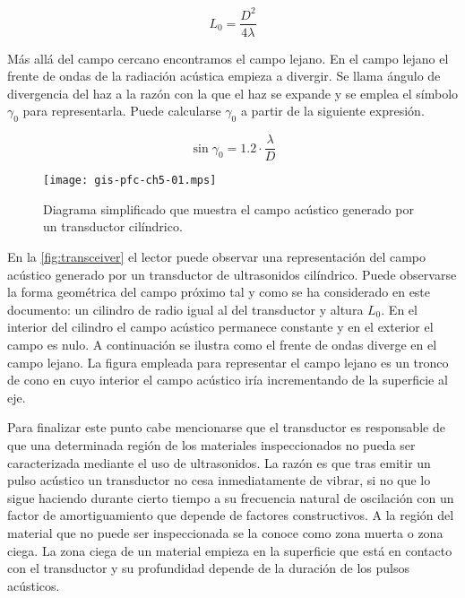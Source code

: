 \begin{equation}
	L_0 = \frac{D^2}{4\lambda}
	\label{eq:nearfield}
\end{equation}

Más allá del campo cercano encontramos el campo lejano. En el campo lejano
el frente de ondas de la radiación acústica empieza a divergir. Se llama
ángulo de divergencia del haz a la razón con la que el haz se expande y se
emplea el símbolo $\gamma_0$ para representarla. Puede calcularse
$\gamma_0$ a partir de la siguiente expresión.

\begin{equation}
	\sin{\gamma_0} = 1.2\cdot\frac{\lambda}{D}
	\label{eq:Adivergence}
\end{equation}

\begin{figure}
	\begin{center}
		\texttt{[image: gis-pfc-ch5-01.mps]}
	\end{center}
	\caption[Campo acústico generado por un transductor
	cilíndrico]{Diagrama simplificado que muestra el campo acústico
	generado por un transductor cilíndrico.}
	\label{fig:transceiver}
\end{figure}

En la \vref{fig:transceiver} el lector puede observar una representación
del campo acústico generado por un transductor de ultrasonidos cilíndrico.
Puede observarse la forma geométrica del campo próximo tal y como se ha
considerado en este documento: un cilindro de radio igual al del
transductor y altura $L_0$. En el interior del cilindro el campo acústico
permanece constante y en el exterior el campo es nulo. A continuación se
ilustra como el frente de ondas diverge en el campo lejano. La figura
empleada para representar el campo lejano es un tronco de cono en cuyo
interior el campo acústico iría incrementando de la superficie al eje.

Para finalizar este punto cabe mencionarse que el transductor es
responsable de que una determinada región de los materiales inspeccionados
no pueda ser caracterizada mediante el uso de ultrasonidos. La razón es que
tras emitir un pulso acústico un transductor no cesa inmediatamente de
vibrar, si no que lo sigue haciendo durante cierto tiempo a su frecuencia
natural de oscilación con un factor de amortiguamiento que depende de
factores constructivos. A la región del material que no puede ser
inspeccionada se la conoce como zona muerta o zona ciega. La zona ciega de
un material empieza en la superficie que está en contacto con el
transductor y su profundidad depende de la duración de los pulsos
acústicos.


